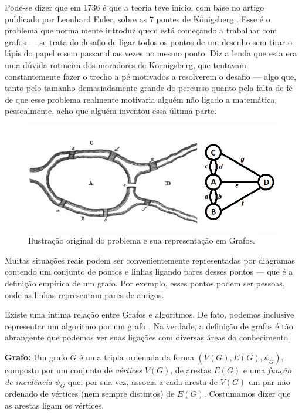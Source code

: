 \documentclass[a4paper,12pt]{article}
\begin{document}
	 Pode-se dizer que em 1736 é que a teoria teve início, com base no artigo publicado por Leonhard Euler, sobre as 7 pontes de Königsberg \cite{euler:KOENIGSBERG} \cite{grafos1}. Esse é o problema que normalmente introduz quem está começando a trabalhar com grafos --- se trata do desafio de ligar todos os pontos de um desenho sem tirar o lápis do papel e sem passar duas vezes no mesmo ponto. Diz a lenda que esta era uma dúvida rotineira dos moradores de Koenigsberg, que tentavam constantemente fazer o trecho a pé motivados a resolverem o desafio --- algo que, tanto pelo tamanho demasiadamente grande do percurso quanto pela falta de fé de que esse problema realmente motivaria alguém não ligado a matemática, pessoalmente, acho que alguém inventou essa última parte. 
	
	\begin{figure}[H]
		\begin{center}
			\includegraphics[width=0.85\linewidth]{koenigsbern.png}
		\end{center}
		\caption{Ilustração original do problema \cite{euler:KOENIGSBERG} e sua representação em Grafos.}
		\label{fig:koni}
	\end{figure}
	
	Muitas situações reais podem ser convenientemente representadas por diagramas contendo um conjunto de pontos e linhas ligando pares desses pontos --- que é a definição empírica de um grafo. Por exemplo, esses pontos podem ser pessoas, onde as linhas representam pares de amigos. 
	
	Existe uma íntima relação entre Grafos e algoritmos. De fato, podemos inclusive representar um algoritmo por um grafo \cite{grafos0}. Na verdade, a definição de grafos é tão abrangente que podemos ver suas ligações com diversas áreas do conhecimento.
		
	\begin{center}
		\begin{minipage}{0.9 \linewidth}
			\textbf{Grafo:} Um grafo $G$ é uma tripla ordenada da forma $(V(G),E(G), \psi_{G})$, composto por um conjunto de \textit{vértices} $V(G)$, de arestas $E(G)$ e uma \textit{função de incidência} $\psi_{G}$ que, por sua vez, associa a cada aresta de $V(G)$ um par não ordenado de vértices (nem sempre distintos) de $E(G)$. Costumamos dizer que as arestas ligam os vértices.
			
		\end{minipage}
	\end{center}
	
\end{document}
